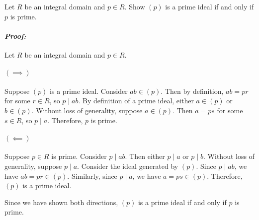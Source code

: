 \documentclass [12pt] {article}
\renewcommand{\it}[1]{\textit{{#1}}}
\newenvironment{problem}{\begin{tcolorbox}[title=Problem,colback=black!5!white,colframe=black!75!black]}{\end{tcolorbox}}
\newenvironment{response}{\begin{responseframe}\vspace{-10pt}\paragraph{\it{Proof:}}}{\end{responseframe}}
\begin{document}
\newpage
\begin{problem}
    Let $R$ be an integral domain and $p\in R$. Show $(p)$ is a prime ideal if
    and only if $p$ is prime.
\end{problem}
\begin{response}
    Let $R$ be an integral domain and $p\in R$.
    \paragraph{$\bm{(\implies)}$}
    Suppose $(p)$ is a prime ideal. Consider $ab\in (p)$. Then by definition,
    $ab=pr$ for some $r\in R$, so $p\mid ab$. By definition of a prime ideal,
    either $a\in (p)$ or $b\in (p)$. Without loss of generality, suppose
    $a\in (p)$. Then $a=ps$ for some $s\in R$, so $p\mid a$. Therefore, $p$ is
    prime.

    \paragraph{$\bm{(\impliedby)}$}
    Suppose $p\in R$ is prime. Consider $p\mid ab$. Then either $p\mid a$ or
    $p\mid b$. Without loss of generality, suppose $p\mid a$. Consider the ideal
    generated by $(p)$. Since $p\mid ab$, we have $ab=pr\in (p)$. Similarly,
    since $p\mid a$, we have $a=ps\in (p)$. Therefore, $(p)$ is a prime ideal.
    \vspace{1em}

    Since we have shown both directions, $(p)$ is a prime ideal if and only if
    $p$ is prime.
\end{response}
\end{document}
